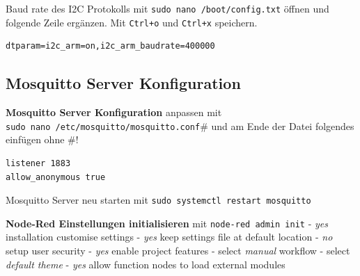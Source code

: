\documentclass[
  11pt,
  a4paper,
  oneside, openany  ,captions=tableheading
]{scrbook}
\theoremstyle{remark}
\begin{document}
Baud rate des I2C Protokolls mit \texttt{sudo\ nano\ /boot/config.txt}
öffnen und folgende Zeile ergänzen. Mit \texttt{Ctrl+o} und
\texttt{Ctrl+x} speichern.

\begin{verbatim}
dtparam=i2c_arm=on,i2c_arm_baudrate=400000
\end{verbatim}

\subsection{Mosquitto Server
Konfiguration}\label{mosquitto-server-konfiguration}

\textbf{Mosquitto Server Konfiguration} anpassen mit
\texttt{sudo\ nano\ /etc/mosquitto/mosquitto.conf}\# und am Ende der
Datei folgendes einfügen ohne \#!

\begin{verbatim}
listener 1883
allow_anonymous true
\end{verbatim}

Mosquitto Server neu starten mit
\texttt{sudo\ systemctl\ restart\ mosquitto}

\textbf{Node-Red Einstellungen initialisieren} mit
\texttt{node-red\ admin\ init} - \emph{yes} installation customise
settings - \emph{yes} keep settings file at default location - \emph{no}
setup user security - \emph{yes} enable project features - select
\emph{manual} workflow - select \emph{default theme} - \emph{yes} allow
function nodes to load external modules
\end{document}
